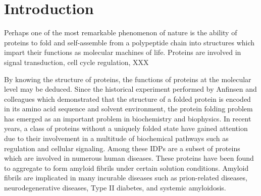 \chapter{Introduction}

% 



Perhaps one of the most remarkable phenomenon of nature is the ability of proteins to fold and self-assemble from a polypeptide chain into structures which impart their functions as molecular machines of life. %
Proteins are involved in signal transduction, cell cycle regulation, XXX

By knowing the structure of proteins, the functions of proteins at the molecular level may be deduced. Since the historical experiment performed by Anfinsen and colleagues which demonstrated that the structure of a folded protein is encoded in its amino acid sequence and solvent environment, the protein folding problem has emerged as an important problem in biochemistry and biophysics.
In recent years, a class of proteins without a uniquely folded state have gained attention due to their involvement in a multitude of biochemical pathways such as regulation and cellular signaling. Among these IDPs are a subset of proteins which are involved in numerous human diseases.  These proteins have been found to aggregate to form amyloid fibrils under certain solution conditions. Amyloid fibrils are implicated in many incurable diseases such as prion-related diseases, neurodegenerative diseases, Type II diabetes, and systemic amyloidosis.

